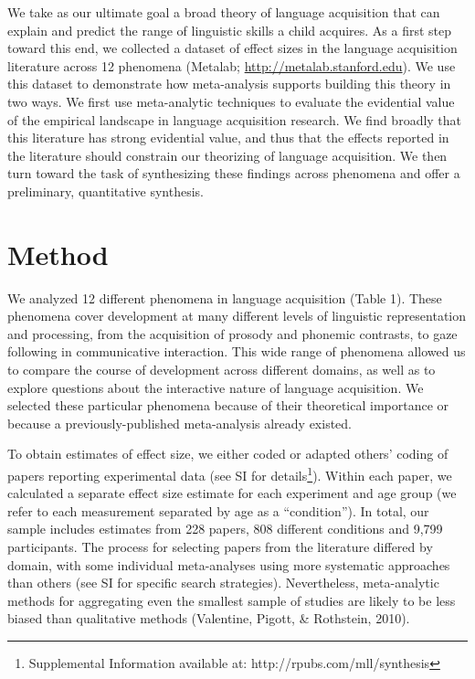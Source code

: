 \documentclass[9pt,twocolumn,twoside,lineno]{pnas-new}
\begin{document}
We take as our ultimate goal a broad theory of language acquisition that
can explain and predict the range of linguistic skills a child acquires.
As a first step toward this end, we collected a dataset of effect sizes
in the language acquisition literature across 12 phenomena (Metalab;
\url{http://metalab.stanford.edu}). We use this dataset to demonstrate
how meta-analysis supports building this theory in two ways. We first
use meta-analytic techniques to evaluate the evidential value of the
empirical landscape in language acquisition research. We find broadly
that this literature has strong evidential value, and thus that the
effects reported in the literature should constrain our theorizing of
language acquisition. We then turn toward the task of synthesizing these
findings across phenomena and offer a preliminary, quantitative
synthesis.

\section*{Method}

We analyzed 12 different phenomena in language acquisition (Table 1).
These phenomena cover development at many different levels of linguistic
representation and processing, from the acquisition of prosody and
phonemic contrasts, to gaze following in communicative interaction. This
wide range of phenomena allowed us to compare the course of development
across different domains, as well as to explore questions about the
interactive nature of language acquisition. We selected these particular
phenomena because of their theoretical importance or because a
previously-published meta-analysis already existed.

To obtain estimates of effect size, we either coded or adapted others'
coding of papers reporting experimental data (see SI for
details\footnote{Supplemental Information available at: http://rpubs.com/mll/synthesis}).
Within each paper, we calculated a separate effect size estimate for
each experiment and age group (we refer to each measurement separated by
age as a \enquote{condition}). In total, our sample includes estimates
from 228 papers, 808 different conditions and 9,799 participants. The
process for selecting papers from the literature differed by domain,
with some individual meta-analyses using more systematic approaches than
others (see SI for specific search strategies). Nevertheless,
meta-analytic methods for aggregating even the smallest sample of
studies are likely to be less biased than qualitative methods
(Valentine, Pigott, \& Rothstein, 2010).
\end{document}
